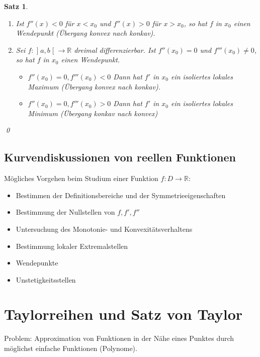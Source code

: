 \documentclass[ngerman,titlepage,twoside, parskip=half*]{scrreprt}
\newcommand*{\R}{\mathbb{R}}
\theoremstyle{plain}
\newtheorem{theorem}{Satz}[section]
\theoremstyle{definition}
\theoremstyle{remark}
\newcommand*{\bsofint}[1]{\mathopen{]}#1\mathclose{[}} %
\begin{document}
\begin{theorem}
\begin{enumerate}[(i)]
\begin{enumerate}[(1)]
	  hat $f$ in $x_0$ einen Wendepunkt (Übergang konkav nach konvex).
	\item Ist $f''(x)<0$ für $x<x_0$ und $f''(x)>0$ für $x>x_0$, so
	  hat $f$ in  $x_0$ einen Wendepunkt (Übergang konvex nach konkav).
	\item Sei $f\colon\bsofint{a,b}\rightarrow\R$ dreimal differenzierbar. Ist
	  $f''(x_0)=0$ und $f'''(x_0)\neq 0$, so hat $f$ in $x_0$
	  einen Wendepunkt.
	  \begin{itemize}
	    \item $f''(x_0)=0, f'''(x_0)<0$ Dann hat $f'$ in $x_0$ ein
	      isoliertes lokales Maximum (Übergang konvex nach konkav).
	    \item $f''(x_0)=0, f'''(x_0)>0$ Dann hat $f'$ in $x_0$ ein
	      isoliertes lokales Minimum (Übergang konkav nach konvex)
	  \end{itemize}
      \end{enumerate}
  \end{enumerate}
  \qed
\end{theorem}

\subsection{Kurvendiskussionen von reellen Funktionen}
Mögliches Vorgehen beim Studium einer Funktion $f\colon D\rightarrow\R$:
\begin{itemize}
  \item Bestimmen der Definitionsbereiche und der Symmetrieeigenschaften
  \item Bestimmung der Nullstellen von $f, f', f''$
  \item Untersuchung des Monotonie- und Konvexitätsverhaltens
  \item Bestimmung lokaler Extremalstellen
  \item Wendepunkte
  \item Unstetigkeitsstellen
\end{itemize}

\section{Taylorreihen und Satz von Taylor}
Problem: Approximation von Funktionen in der Nähe eines Punktes durch
möglichst einfache Funktionen (Polynome).
\end{document}

